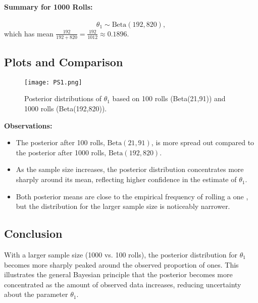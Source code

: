 \documentclass[final,11pt]{article}
\begin{document}
\begin{spacing}{1.25}
\paragraph{Summary for 1000 Rolls:}
\[
\theta_1 \sim \text{Beta}(192,820), 
\]
which has mean 
\(\displaystyle \frac{192}{192 + 820} = \frac{192}{1012} \approx 0.1896.\)

\subsection*{Plots and Comparison}

\begin{figure}[h!]
    \centering
        \centering
        \texttt{[image: PS1.png]}
    \caption{Posterior distributions of \(\theta_1\) based on 100 rolls (Beta(21,91)) and 1000 rolls (Beta(192,820)).}
    \label{fig:posterior_plots}
\end{figure}

\noindent
\textbf{Observations:}

\begin{itemize}
    \item The posterior after 100 rolls, \(\text{Beta}(21,91)\), is more spread out compared to the posterior after 1000 rolls, \(\text{Beta}(192,820)\). 
    \item As the sample size increases, the posterior distribution concentrates more sharply around its mean, reflecting higher confidence in the estimate of \(\theta_1\).
    \item Both posterior means are close to the empirical frequency of rolling a one , but the distribution for the larger sample size is noticeably narrower.
\end{itemize}

\subsection*{Conclusion}

With a larger sample size (1000 vs. 100 rolls), the posterior distribution for \(\theta_1\) becomes more sharply peaked around the observed proportion of ones. This illustrates the general Bayesian principle that the posterior becomes more concentrated as the amount of observed data increases, reducing uncertainty about the parameter \(\theta_1\).

\end{spacing}
\end{document}
